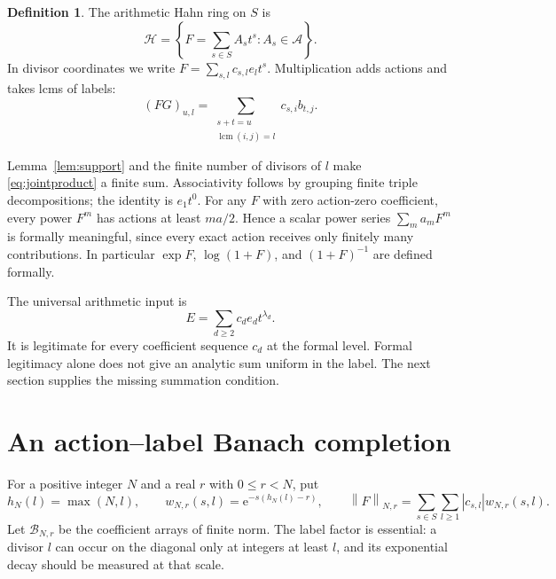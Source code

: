 \documentclass[11pt,a4paper]{article}
\numberwithin{equation}{section}
\theoremstyle{definition}
\newtheorem{definition}[theorem]{Definition}
\theoremstyle{remark}
\newcommand{\A}{\mathcal A}
\newcommand{\B}{\mathcal B}
\newcommand{\HH}{\mathscr H}
\newcommand{\ee}{\mathrm e}
\newcommand{\lcm}{\operatorname{lcm}}
\newcommand{\norm}[1]{\left\|#1\right\|}
\begin{document}
\begin{definition}
The arithmetic Hahn ring on $S$ is
\begin{equation}
 \HH=\left\{F=\sum_{s\in S}A_s t^s:A_s\in\A\right\}.
 \label{eq:Hahn}
\end{equation}
In divisor coordinates we write
$F=\sum_{s,l}c_{s,l}e_l t^s$. Multiplication adds actions and takes lcms
of labels:
\begin{equation}
 (FG)_{u,l}=
 \sum_{\substack{s+t=u\\\lcm(i,j)=l}}c_{s,i}b_{t,j}.
 \label{eq:jointproduct}
\end{equation}
\end{definition}

Lemma~\ref{lem:support} and the finite number of divisors of $l$ make
\eqref{eq:jointproduct} a finite sum. Associativity follows by grouping
finite triple decompositions; the identity is $e_1t^0$.
For any $F$ with zero action-zero coefficient, every power $F^m$ has
actions at least $ma/2$. Hence a scalar power series $\sum_m a_mF^m$
is formally meaningful, since every exact action receives only finitely
many contributions. In particular $\exp F$, $\log(1+F)$, and
$(1+F)^{-1}$ are defined formally.

The universal arithmetic input is
\begin{equation}
 E=\sum_{d\ge2}c_de_dt^{\lambda_d}.
 \label{eq:universalE}
\end{equation}
It is legitimate for every coefficient sequence $c_d$ at the formal
level. Formal legitimacy alone does not give an analytic sum uniform in
the label. The next section supplies the missing summation condition.

\section{An action--label Banach completion}\label{sec:banach}

For a positive integer $N$ and a real $r$ with $0\le r<N$, put
\begin{equation}
 h_N(l)=\max(N,l),\qquad
 w_{N,r}(s,l)=\ee^{-s(h_N(l)-r)},
 \qquad
 \norm{F}_{N,r}=\sum_{s\in S}\sum_{l\ge1}|c_{s,l}|w_{N,r}(s,l).
 \label{eq:norm}
\end{equation}
Let $\B_{N,r}$ be the coefficient arrays of finite norm. The label
factor is essential: a divisor $l$ can occur on the diagonal only at
integers at least $l$, and its exponential decay should be measured at
that scale.
\end{document}
